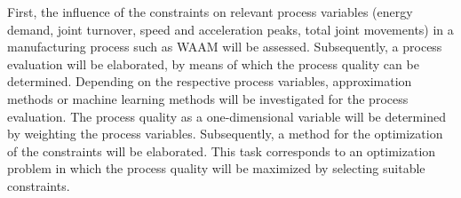 First, the influence of the constraints on relevant process variables (energy demand, joint turnover, speed and acceleration peaks, total joint movements) in a manufacturing process such as WAAM will be assessed. Subsequently, a process evaluation will be elaborated, by means of which the process quality can be determined. Depending on the respective process variables, approximation methods or machine learning methods will be investigated for the process evaluation. The process quality as a one-dimensional variable will be determined by weighting the process variables. Subsequently, a method for the optimization of the constraints will be elaborated. This task corresponds to an optimization problem in which the process quality will be maximized by selecting suitable constraints. 
